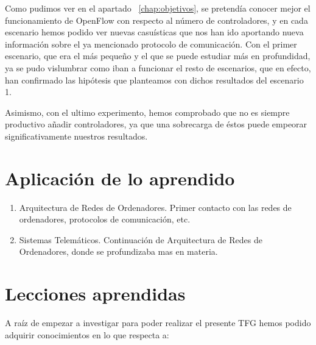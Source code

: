 \documentclass[a4paper, 12pt]{book}
\begin{document}
	Como pudimos ver en el apartado ~\ref{chap:objetivos}, se pretendía conocer mejor el funcionamiento de OpenFlow con respecto al número de controladores, y en cada escenario hemos podido ver nuevas casuísticas que nos han ido aportando nueva información sobre el ya mencionado protocolo de comunicación. Con el primer escenario, que era el más pequeño y el que se puede estudiar más en profundidad, ya se pudo vislumbrar como iban a funcionar el resto de escenarios, que en efecto, han confirmado las hipótesis que planteamos con dichos resultados del escenario 1.
	
	Asimismo, con el ultimo experimento, hemos comprobado que no es siempre productivo añadir controladores, ya que una sobrecarga de éstos puede empeorar significativamente nuestros resultados.
	
	\section{Aplicación de lo aprendido}
	\label{sec:aplicacion}
	
	\begin{enumerate}
		\item Arquitectura de Redes de Ordenadores. Primer contacto con las redes de ordenadores, protocolos de comunicación, etc.
		\item Sistemas Telemáticos. Continuación de Arquitectura de Redes de Ordenadores, donde se profundizaba mas en materia.
	\end{enumerate}
	
	
	\section{Lecciones aprendidas}
	\label{sec:lecciones_aprendidas}
	
	A raíz de empezar a investigar para poder realizar el presente TFG hemos podido adquirir conocimientos en lo que respecta a:
	
\end{document}
